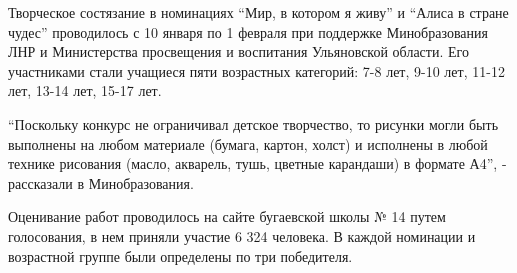 Творческое состязание в номинациях \enquote{Мир, в котором я живу} и \enquote{Алиса в стране
чудес} проводилось с 10 января по 1 февраля при поддержке Минобразования ЛНР и
Министерства просвещения и воспитания Ульяновской области. Его участниками
стали учащиеся пяти возрастных категорий: 7-8 лет, 9-10 лет, 11-12 лет, 13-14
лет, 15-17 лет.


\enquote{Поскольку конкурс не ограничивал детское творчество, то рисунки могли быть
выполнены на любом материале (бумага, картон, холст) и исполнены в любой
технике рисования (масло, акварель, тушь, цветные карандаши) в формате А4}, -
рассказали в Минобразования.


Оценивание работ проводилось на сайте бугаевской школы № 14 путем голосования,
в нем приняли участие 6 324 человека. В каждой номинации и возрастной группе
были определены по три победителя.

